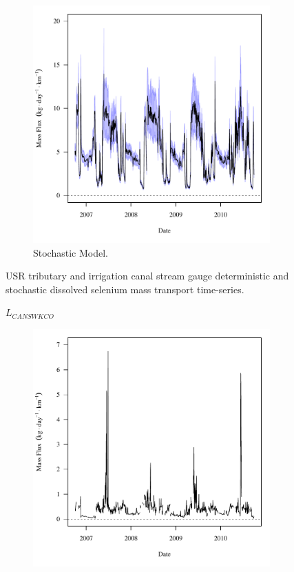 \begin{linenumbers}
\begin{landscape}
\begin{figure}
\begin{subfigure}{0.7\textwidth}
			\includegraphics[width=\tableCustomSize]{"Figures/Results_USR/Stochastic/f U201"}
			\caption{Stochastic Model.}
		\end{subfigure}
		\caption{USR tributary and irrigation canal stream gauge deterministic and stochastic dissolved selenium mass transport time-series.}
	\end{figure}
\end{landscape}
\subfiguremid
\begin{landscape}
	\begin{figure}
		$ \displaystyle L_{CANSWKCO} $
		\begin{subfigure}{0.7\textwidth}
			\centering
			\includegraphics[width=\tableCustomSize]{"Figures/Results_USR/Deterministic/f CAN"}

\end{subfigure}
\end{figure}
\end{landscape}
\end{linenumbers}
